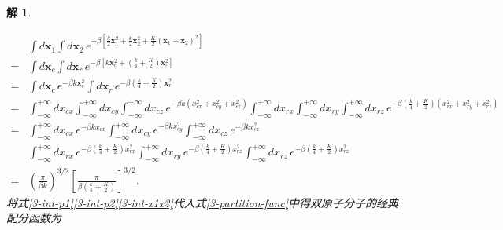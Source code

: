 \documentclass[UTF8,10pt,a4paper]{article}
\theoremstyle{Problem}
\theoremstyle{Solution}
\newtheorem*{sol}{解}
\begin{document}
\begin{sol}
\begin{itemize}
              \begin{align}
                  \label{3-int-x1x2}
                  \nonumber  & \int d\bm{x}_1\int d\bm{x}_2\,e^{-\beta\left[\frac{k}{2}\bm{x}_1^2+\frac{k}{2}\bm{x}_2^2+\frac{K}{2}(\bm{x}_1-\bm{x}_2)^2\right]}                                                                                                                                                                                \\
                  \nonumber= & \int d\bm{x}_c\int d\bm{x}_r\,e^{-\beta\left[k\bm{x}_c^2+\left(\frac{k}{4}+\frac{K}{2}\right)\bm{x}_r^2\right]}                                                                                                                                                                                                  \\
                  \nonumber= & \int d\bm{x}_c\,e^{-\beta k\bm{x}_c^2}\int d\bm{x}_r\,e^{-\beta\left(\frac{k}{4}+\frac{K}{2}\right)\bm{x}_r^2}                                                                                                                                                                                                   \\
                  \nonumber= & \int_{-\infty}^{+\infty}dx_{cx}\int_{-\infty}^{+\infty}dx_{cy}\int_{-\infty}^{+\infty}dx_{cz}\,e^{-\beta k(x_{cx}^2+x_{cy}^2+x_{cz}^2)}\int_{-\infty}^{+\infty}dx_{rx}\int_{-\infty}^{+\infty}dx_{ry}\int_{-\infty}^{+\infty}dx_{rz}\,e^{-\beta\left(\frac{k}{4}+\frac{K}{2}\right)(x_{rx}^2+x_{ry}^2+x_{rz}^2)} \\
                  \nonumber= & \int_{-\infty}^{+\infty}dx_{cx}\,e^{-\beta kx_{cx}}\int_{-\infty}^{+\infty}dx_{cy}\,e^{-\beta kx_{cy}^2}\int_{-\infty}^{+\infty}dx_{cz}\,e^{-\beta kx_{cz}^2}                                                                                                                                                    \\
                  \nonumber  & \int_{-\infty}^{+\infty}dx_{rx}\,e^{-\beta\left(\frac{k}{4}+\frac{K}{2}\right)x_{rx}^2}\int_{-\infty}^{+\infty}dx_{ry}\,e^{-\beta\left(\frac{k}{4}+\frac{K}{2}\right)x_{rz}^2}\int_{-\infty}^{+\infty}dx_{rz}\,e^{-\beta\left(\frac{k}{4}+\frac{K}{2}\right)x_{rz}^2}                                            \\
                  =          & \left(\frac{\pi}{\beta k}\right)^{3/2}\left[\frac{\pi}{\beta\left(\frac{k}{4}+\frac{K}{2}\right)}\right]^{3/2}.
              \end{align}
              将式\eqref{3-int-p1}\eqref{3-int-p2}\eqref{3-int-x1x2}代入式\eqref{3-partition-func}中得双原子分子的经典配分函数为

\end{itemize}
\end{sol}
\end{document}
